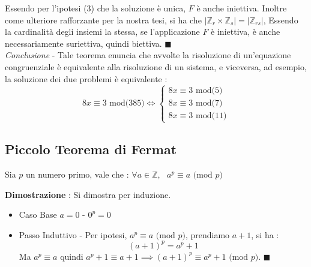 \documentclass[12pt, letterpaper]{article}
\begin{document}
Essendo per l'ipotesi (3) che la soluzione è unica, \(F\) è anche iniettiva. Inoltre come ulteriore 
rafforzante per la nostra tesi, si ha che \(|\mathbb{Z}_r\times \mathbb{Z}_s|=|\mathbb{Z}_{rs}|\), 
Essendo la cardinalità degli insiemi la stessa, se l'applicazione \(F\) è iniettiva, è anche 
necessariamente suriettiva, quindi biettiva. \(\blacksquare\)
\\\textit{Conclusione} - Tale teorema enuncia che avvolte la risoluzione di un'equazione congruenziale 
è equivalente alla risoluzione di un sistema, e viceversa, ad esempio, la soluzione dei due problemi 
è equivalente :\begin{equation}
    8x\equiv 3 \text{ mod(}385\text{)}\iff \begin{cases}
        8x\equiv 3 \text{ mod(}5\text{)}\\
        8x\equiv 3 \text{ mod(}7\text{)}\\
        8x\equiv 3 \text{ mod(}11\text{)}
    \end{cases}
\end{equation}

\subsection{Piccolo Teorema di Fermat}   \begin{center}        
Sia \(p\) un numero primo, vale che : \(\forall a\in \mathbb{Z},\text{ }a^p\equiv a \text{ (mod }p\text{)}\)
\end{center} 
\textbf{Dimostrazione }: Si dimostra per induzione. \begin{itemize}
    \item Caso Base \(a=0\) - \(0^p = 0\)
    \item Passo Induttivo - Per ipotesi, \(a^p\equiv a \text{ (mod }p\text{)}\), prendiamo \(a+1\), si ha 
    : \begin{equation}
        (a+1)^p=a^p+1
    \end{equation}
    Ma \(a^p\equiv a\) quindi \(a^p+1\equiv a+1 \implies (a+1)^p\equiv a^p+1 \text{ (mod }p\text{)}\). \(\blacksquare\)
\end{itemize}  
\end{document}
